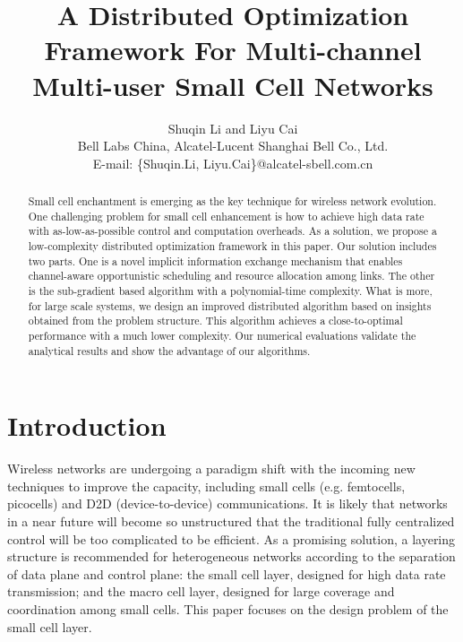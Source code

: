 \documentclass[conference]{IEEEtran}
\begin{document}
\newcommand{\rev}[1]{{\color{black}#1}} \newcommand{\com}[1]{\textbf{\color{red} (COMMENT: #1)}} \newcommand{\response}[1]{\textbf{\color{magenta} (RESPONSE: #1)}} \else
\newcommand{\rev}[1]{#1}
\newcommand{\com}[1]{}
\newcommand{\response}[1]{}
\fi

\title{A Distributed Optimization Framework For Multi-channel Multi-user Small Cell Networks}


\author{Shuqin Li and Liyu Cai \\Bell Labs China, Alcatel-Lucent Shanghai Bell Co., Ltd.\\
E-mail: \{Shuqin.Li, Liyu.Cai\}@alcatel-sbell.com.cn}

\maketitle
\begin{abstract}



Small cell enchantment is emerging as the key technique for wireless network evolution.
{One challenging problem for small cell enhancement is how to achieve high data rate with as-low-as-possible control and computation overheads. As a solution, we propose a low-complexity distributed optimization framework in this paper.}
Our solution includes two parts. One is a novel implicit information exchange mechanism that enables channel-aware opportunistic scheduling and resource allocation among links. The other is the sub-gradient based algorithm with a polynomial-time complexity. What is more, for large scale systems, we design an improved distributed algorithm based on insights obtained from the problem structure. This algorithm achieves a close-to-optimal performance with a much lower complexity. Our numerical evaluations validate the analytical results and show the advantage of our algorithms.
\end{abstract}
\section{Introduction}
Wireless networks are undergoing a paradigm shift with the incoming new techniques to improve the capacity, including small cells (e.g. femtocells, picocells) and D2D (device-to-device) communications.
It is likely that networks in a near future will become so unstructured that the traditional fully centralized control will be too complicated to be efficient.
As a promising solution, a layering structure is recommended for heterogeneous networks according to the separation of data plane and control plane: the small cell layer, designed for high data rate transmission; and the macro cell layer, designed for large coverage and coordination among small cells. This paper focuses on the design problem of the small cell layer.
\end{document}
